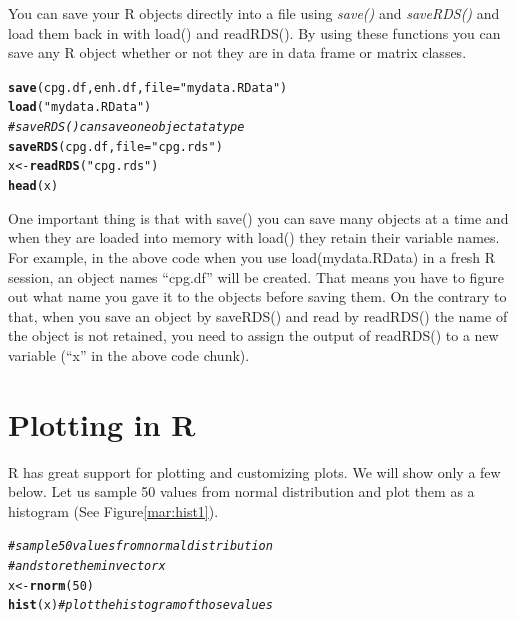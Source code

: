 \documentclass[english,nohyper]{tufte-book}\usepackage[]{graphicx}\usepackage[]{color}
\makeatletter
\newcommand{\hlnum}[1]{\textcolor[rgb]{0.686,0.059,0.569}{#1}}%
\newcommand{\hlstr}[1]{\textcolor[rgb]{0.192,0.494,0.8}{#1}}%
\newcommand{\hlcom}[1]{\textcolor[rgb]{0.678,0.584,0.686}{\textit{#1}}}%
\newcommand{\hlstd}[1]{\textcolor[rgb]{0.345,0.345,0.345}{#1}}%
\newcommand{\hlkwb}[1]{\textcolor[rgb]{0.69,0.353,0.396}{#1}}%
\newcommand{\hlkwc}[1]{\textcolor[rgb]{0.333,0.667,0.333}{#1}}%
\newcommand{\hlkwd}[1]{\textcolor[rgb]{0.737,0.353,0.396}{\textbf{#1}}}%
\newenvironment{kframe}{%
 \def\at@end@of@kframe{}%
 \ifinner\ifhmode%
  \def\at@end@of@kframe{\end{minipage}}%
  \begin{minipage}{\columnwidth}%
 \fi\fi%
 \def\FrameCommand##1{\hskip\@totalleftmargin \hskip-\fboxsep
 \colorbox{shadecolor}{##1}\hskip-\fboxsep
     \hskip-\linewidth \hskip-\@totalleftmargin \hskip\columnwidth}%
 \MakeFramed {\advance\hsize-\width
   \@totalleftmargin\z@ \linewidth\hsize
   \@setminipage}}%
 {\par\unskip\endMakeFramed%
 \at@end@of@kframe}
\newenvironment{knitrout}{}{} %
\makeatother
\begin{document}
You can save your R objects directly into a file using \emph{save()}
and \emph{saveRDS() }and load them back in with load() and readRDS().
By using these functions you can save any R object whether or not
they are in data frame or matrix classes.

\begin{knitrout}
\color{fgcolor}\begin{kframe}
\begin{alltt}
\hlkwd{save}\hlstd{(cpg.df, enh.df,} \hlkwc{file} \hlstd{=} \hlstr{"mydata.RData"}\hlstd{)}
\hlkwd{load}\hlstd{(}\hlstr{"mydata.RData"}\hlstd{)}
\hlcom{# saveRDS() can save one object at a type}
\hlkwd{saveRDS}\hlstd{(cpg.df,} \hlkwc{file} \hlstd{=} \hlstr{"cpg.rds"}\hlstd{)}
\hlstd{x} \hlkwb{<-} \hlkwd{readRDS}\hlstd{(}\hlstr{"cpg.rds"}\hlstd{)}
\hlkwd{head}\hlstd{(x)}
\end{alltt}
\end{kframe}
\end{knitrout}


One important thing is that with save() you can save many objects
at a time and when they are loaded into memory with load() they retain
their variable names. For example, in the above code when you use
load(\textquotedbl{}mydata.RData\textquotedbl{}) in a fresh R session,
an object names ``cpg.df'' will be created. That means you have
to figure out what name you gave it to the objects before saving them.
On the contrary to that, when you save an object by saveRDS() and
read by readRDS() the name of the object is not retained, you need
to assign the output of readRDS() to a new variable (``x'' in the
above code chunk).


\section{Plotting in R}

R has great support for plotting and customizing plots. We will show
only a few below. Let us sample 50 values from normal distribution
and plot them as a histogram (See Figure\ref{mar:hist1}).

\begin{knitrout}
\color{fgcolor}\begin{kframe}
\begin{alltt}
\hlcom{# sample 50 values from normal distribution }
\hlcom{# and store them in vector x }
\hlstd{x}\hlkwb{<-}\hlkwd{rnorm}\hlstd{(}\hlnum{50}\hlstd{)}
\hlkwd{hist}\hlstd{(x)} \hlcom{# plot the histogram of those values }
\end{alltt}
\end{kframe}
\end{knitrout}
\end{document}
